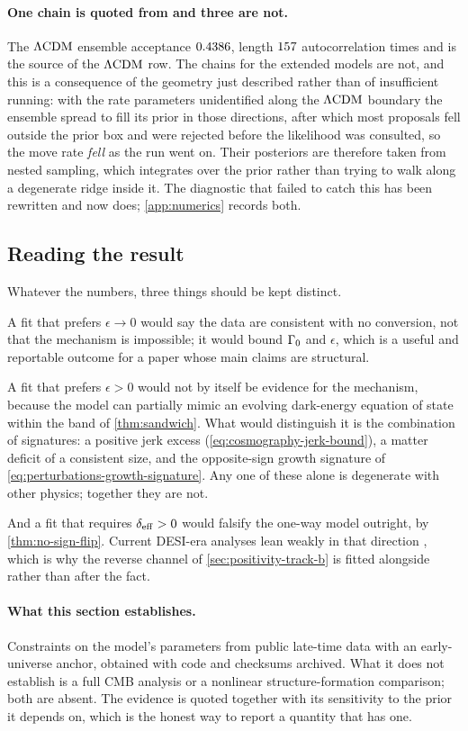 \paragraph{One chain is quoted from and three are not.} The $\Lambda\mathrm{CDM}$ ensemble
acceptance $0.4386$, length $157$ autocorrelation times
and is the source of the $\Lambda\mathrm{CDM}$ row. The chains for the extended models are
not, and this is a consequence of the geometry just described rather than of
insufficient running: with the rate parameters unidentified along the
$\Lambda\mathrm{CDM}$ boundary the ensemble spread to fill its prior in those directions,
after which most proposals fell outside the prior box and were rejected before
the likelihood was consulted, so the move rate \emph{fell} as the run went on.
Their posteriors are therefore taken from nested sampling, which integrates
over the prior rather than trying to walk along a degenerate ridge inside it.
The diagnostic that failed to catch this has been rewritten and now does;
\cref{app:numerics} records both.

\subsection{Reading the result}\label{sec:observations-reading}

Whatever the numbers, three things should be kept distinct.

A fit that prefers $\epsilon\to0$ would say the data are consistent with no
conversion, not that the mechanism is impossible; it would bound $\Gamma_{0}$ and
$\epsilon$, which is a useful and reportable outcome for a paper whose main
claims are structural.

A fit that prefers $\epsilon>0$ would not by itself be evidence for the
mechanism, because the model can partially mimic an evolving dark-energy
equation of state within the band of \cref{thm:sandwich}. What would
distinguish it is the combination of signatures: a positive jerk excess
(\cref{eq:cosmography-jerk-bound}), a matter deficit of a consistent size, and the opposite-sign growth signature of
\cref{eq:perturbations-growth-signature}. Any one of these alone is degenerate
with other physics; together they are not.

And a fit that requires $\delta_{\rm eff}>0$ would falsify the one-way model
outright, by \cref{thm:no-sign-flip}. Current DESI-era analyses lean weakly in
that direction \parencite{kandel2026_260712283,yang2026_260821938}, which is why
the reverse channel of \cref{sec:positivity-track-b} is fitted alongside rather
than after the fact.

\paragraph{What this section establishes.}
Constraints on the model's parameters from public late-time data with an
early-universe anchor, obtained with code and checksums archived. What it does
not establish is a full CMB analysis or a nonlinear structure-formation
comparison; both are absent. The evidence is quoted together with its
sensitivity to the prior it depends on, which is the honest way to report a
quantity that has one.
